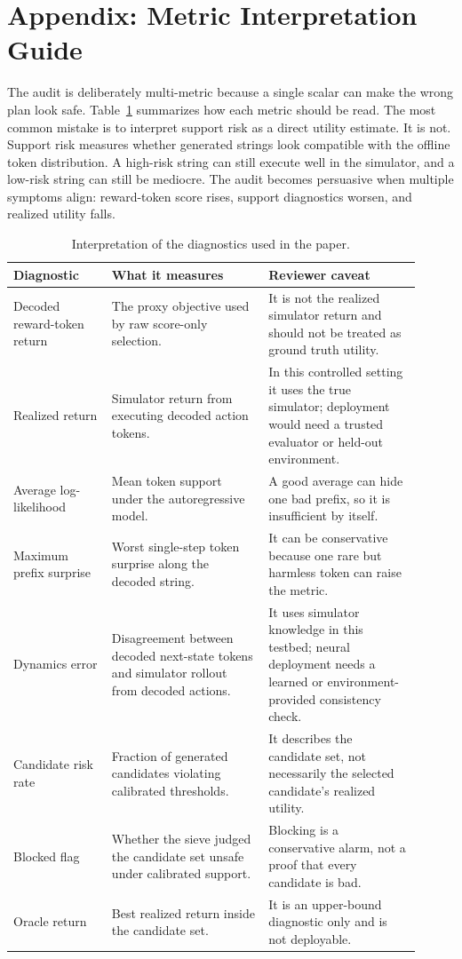 \documentclass{article}
\begin{document}
\section{Appendix: Metric Interpretation Guide}

The audit is deliberately multi-metric because a single scalar can make the wrong plan look safe. Table~\ref{tab:metric-guide} summarizes how each metric should be read. The most common mistake is to interpret support risk as a direct utility estimate. It is not. Support risk measures whether generated strings look compatible with the offline token distribution. A high-risk string can still execute well in the simulator, and a low-risk string can still be mediocre. The audit becomes persuasive when multiple symptoms align: reward-token score rises, support diagnostics worsen, and realized utility falls.

\begin{table}[t]
\caption{Interpretation of the diagnostics used in the paper.}
\label{tab:metric-guide}
\begin{center}
\small
\begin{tabular}{p{0.22\linewidth}p{0.35\linewidth}p{0.34\linewidth}}
\toprule
Diagnostic & What it measures & Reviewer caveat \\
\midrule
Decoded reward-token return & The proxy objective used by raw score-only selection. & It is not the realized simulator return and should not be treated as ground truth utility. \\
Realized return & Simulator return from executing decoded action tokens. & In this controlled setting it uses the true simulator; deployment would need a trusted evaluator or held-out environment. \\
Average log-likelihood & Mean token support under the autoregressive model. & A good average can hide one bad prefix, so it is insufficient by itself. \\
Maximum prefix surprise & Worst single-step token surprise along the decoded string. & It can be conservative because one rare but harmless token can raise the metric. \\
Dynamics error & Disagreement between decoded next-state tokens and simulator rollout from decoded actions. & It uses simulator knowledge in this testbed; neural deployment needs a learned or environment-provided consistency check. \\
Candidate risk rate & Fraction of generated candidates violating calibrated thresholds. & It describes the candidate set, not necessarily the selected candidate's realized utility. \\
Blocked flag & Whether the sieve judged the candidate set unsafe under calibrated support. & Blocking is a conservative alarm, not a proof that every candidate is bad. \\
Oracle return & Best realized return inside the candidate set. & It is an upper-bound diagnostic only and is not deployable. \\
\bottomrule
\end{tabular}
\end{center}
\end{table}
\end{document}
